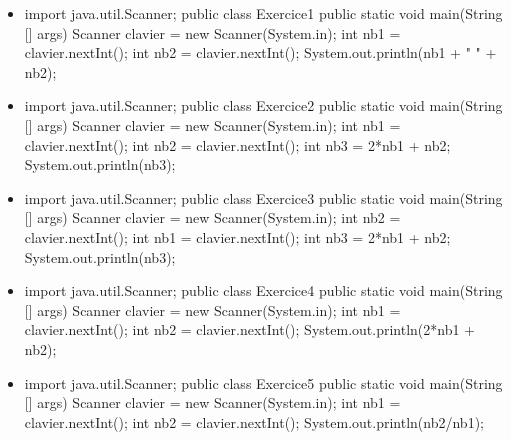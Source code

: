 \documentclass[11pt,a4paper]{article}
\begin{document}
\begin{itemize}
			\item \begin{Java}
import java.util.Scanner;
public class Exercice1 {
    public static void main(String [] args) {
        Scanner clavier = new Scanner(System.in);
        int nb1 = clavier.nextInt();
        int nb2 = clavier.nextInt();
        System.out.println(nb1 + " " + nb2);
    }
}
        \end{Java} \textcolor{gray}{\underline{\hspace*{2em}}} 
			\item \begin{Java}
import java.util.Scanner;
public class Exercice2 {
    public static void main(String [] args) {
        Scanner clavier = new Scanner(System.in);
        int nb1 = clavier.nextInt();
        int nb2 = clavier.nextInt();
        int nb3 = 2*nb1 + nb2;
        System.out.println(nb3);
    }
}
        \end{Java} \textcolor{gray}{\underline{\hspace*{1em}}} 
			\item \begin{Java}
import java.util.Scanner;
public class Exercice3 {
    public static void main(String [] args) {
        Scanner clavier = new Scanner(System.in);
        int nb2 = clavier.nextInt();
        int nb1 = clavier.nextInt();
        int nb3 = 2*nb1 + nb2;
        System.out.println(nb3);
    }
}
        \end{Java} \textcolor{gray}{\underline{\hspace*{1em}}} 
			\item \begin{Java}
import java.util.Scanner;
public class Exercice4 {
    public static void main(String [] args) {
        Scanner clavier = new Scanner(System.in);
        int nb1 = clavier.nextInt();
        int nb2 = clavier.nextInt();
        System.out.println(2*nb1 + nb2);
    }
}
        \end{Java} \textcolor{gray}{\underline{\hspace*{1em}}} 
			\item \begin{Java}
import java.util.Scanner;
public class Exercice5 {
    public static void main(String [] args) {
        Scanner clavier = new Scanner(System.in);
        int nb1 = clavier.nextInt();
        int nb2 = clavier.nextInt();
        System.out.println(nb2/nb1);
    }
}
        \end{Java} \textcolor{gray}{\underline{\hspace*{1em}}} 

\end{itemize}
\end{document}
